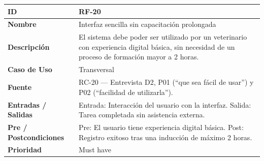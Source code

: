 \documentclass[
]{article}
\newcounter{none} %
\begin{document}
{\def\LTcaptype{none} %
\begin{longtable}[]{|
  >{\raggedright\arraybackslash}p{}|
  >{\raggedright\arraybackslash}p{}|}
\hline
\begin{minipage}[b]{\linewidth}\raggedright
\textbf{ID}
\end{minipage} & \begin{minipage}[b]{\linewidth}\raggedright
RF-20
\end{minipage} \\
\hline
\endhead
\hline
\endlastfoot
\textbf{Nombre} & \begin{minipage}[t]{\linewidth}\raggedright
Interfaz sencilla sin capacitación prolongada
\end{minipage} \\
\hline
\textbf{Descripción} & \begin{minipage}[t]{\linewidth}\raggedright
El sistema debe poder ser utilizado por un veterinario con experiencia digital básica, sin necesidad de un proceso de formación mayor a 2 horas.
\end{minipage} \\
\hline
\textbf{Caso de Uso} & \begin{minipage}[t]{\linewidth}\raggedright
Transversal
\end{minipage} \\
\hline
\textbf{Fuente} & \begin{minipage}[t]{\linewidth}\raggedright
RC-20 — Entrevista D2, P01 (“que sea fácil de usar”) y P02 (“facilidad de utilizarla”).
\end{minipage} \\
\hline
\textbf{Entradas / Salidas} & \begin{minipage}[t]{\linewidth}\raggedright
Entrada: Interacción del usuario con la interfaz. Salida: Tarea completada sin asistencia externa.
\end{minipage} \\
\hline
\textbf{Pre / Postcondiciones} & \begin{minipage}[t]{\linewidth}\raggedright
Pre: El usuario tiene experiencia digital básica. Post: Registro exitoso tras una inducción de máximo 2 horas.
\end{minipage} \\
\hline
\textbf{Prioridad} & \begin{minipage}[t]{\linewidth}\raggedright
Must have
\end{minipage} \\

\end{longtable}}
\end{document}
